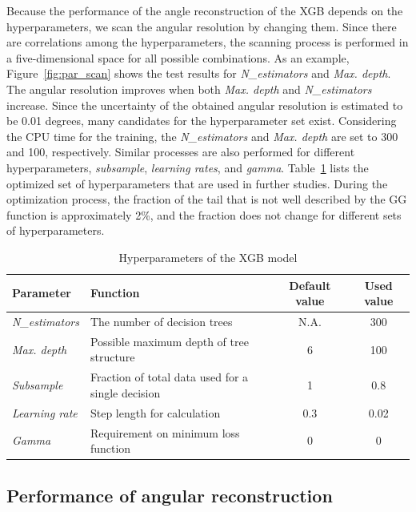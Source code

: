 \documentclass[12pt,times,draftclsnofoot,a4paper]{elsarticle}
\begin{document}
Because the performance of the angle reconstruction of the XGB depends on the hyperparameters, we scan the angular resolution by changing them. Since there are correlations among the hyperparameters, the scanning process is performed in a five-dimensional space for all possible combinations. As an example, Figure~\ref{fig:par_scan} shows the test results for \textit{N\_estimators} and \textit{Max. depth}. The angular resolution improves when both \textit{Max. depth} and \textit{N\_estimators} increase. Since the uncertainty of the obtained angular resolution is estimated to be 0.01 degrees, many candidates for the hyperparameter set exist. Considering the CPU time for the training, the \textit{N\_estimators} and \textit{Max. depth} are set to 300 and 100, respectively. Similar processes are also performed for different hyperparameters, \textit{subsample}, \textit{learning rates}, and \textit{gamma}. Table~\ref{tab:XgbPar} lists the optimized set of hyperparameters that are used in further studies. During the optimization process, the fraction of the tail that is not well described by the GG function is approximately 2\%, and the fraction does not change for different sets of hyperparameters.

\begin{table}[hbt!]{\small
\centering
\caption{Hyperparameters of the XGB model}
\begin{tabular}{llcc}
\hline 
Parameter & Function & Default value & Used value \\ \hline 
\textit{N\_estimators} & The number of decision trees & N.A. & 300 \\  
\textit{Max. depth} & Possible maximum depth of tree structure & 6 & 100 \\ 
\textit{Subsample} & Fraction of total data used for a single decision & 1 & 0.8 \\ 
\textit{Learning rate} & Step length for calculation & 0.3 & 0.02 \\ 
\textit{Gamma} & Requirement on minimum loss function & 0 & 0 \\ 
\hline
\end{tabular}
\label{tab:XgbPar}
}\end{table}

\subsection{Performance of angular reconstruction}
\label{sec:perf}
\end{document}
